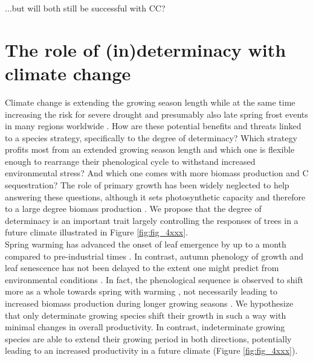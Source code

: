 \documentclass{article}
\begin{document}
	...but will both still be successful with CC?
	
\section*{The role of (in)determinacy with climate change}
Climate change is extending the growing season length while at the same time increasing the risk for severe drought \citep{haoChangesSeverityCompound2018} and presumably also late spring frost events in many regions worldwide \citep{zohnerLatespringFrostRisk2020}. How are these potential benefits and threats linked to a species strategy, specifically to the degree of determinacy? Which strategy profits most from an extended growing season length and which one is flexible enough to rearrange their phenological cycle to withstand increased environmental stress? And which one comes with more biomass production and C sequestration? The role of primary growth has been widely neglected to help answering these questions, although it sets photosynthetic capacity and therefore to a large degree biomass production \citep{girardPolycyclismFundamentalTree2011}. We propose that the degree of determinacy is an important trait largely controlling the responses of trees in a future climate illustrated in Figure \ref{fig:fig_4xxx}. \\

Spring warming has advanced the onset of leaf emergence by up to a month compared to pre-industrial times \citep{vitasseGreatAccelerationPlant2022b}. In contrast, autumn phenology of growth and leaf senescence has not been delayed to the extent one might predict from environmental conditions \citep{zaniIncreasedGrowingseasonProductivity2020b, zohnerEffectClimateWarming2023}. In fact, the phenological sequence is observed to shift more as a whole towards spring with warming \citep{keenanTimingAutumnSenescence2015b}, not necessarily leading to increased biomass production during longer growing seasons \citep{zaniIncreasedGrowingseasonProductivity2020b}. We hypothesize that only determinate growing species shift their growth in such a way with minimal changes in overall productivity. In contrast, indeterminate growing species are able to extend their growing period in both directions, potentially leading to an increased productivity in a future climate (Figure \ref{fig:fig_4xxx}). \\
\end{document}
